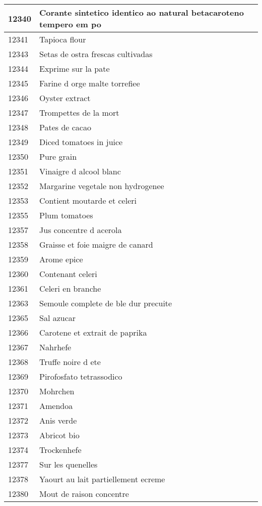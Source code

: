 \begin{longtable}{|l|l|}
12340 & Corante sintetico identico ao natural betacaroteno tempero em po \\ \hline 
12341 & Tapioca flour \\ \hline 
12343 & Setas de ostra frescas cultivadas \\ \hline 
12344 & Exprime sur la pate \\ \hline 
12345 & Farine d orge malte torrefiee \\ \hline 
12346 & Oyster extract \\ \hline 
12347 & Trompettes de la mort \\ \hline 
12348 & Pates de cacao \\ \hline 
12349 & Diced tomatoes in juice \\ \hline 
12350 & Pure grain \\ \hline 
12351 & Vinaigre d alcool blanc \\ \hline 
12352 & Margarine vegetale non hydrogenee \\ \hline 
12353 & Contient moutarde et celeri \\ \hline 
12355 & Plum tomatoes \\ \hline 
12357 & Jus concentre d acerola \\ \hline 
12358 & Graisse et foie maigre de canard \\ \hline 
12359 & Arome epice \\ \hline 
12360 & Contenant celeri \\ \hline 
12361 & Celeri en branche \\ \hline 
12363 & Semoule complete de ble dur precuite \\ \hline 
12365 & Sal azucar \\ \hline 
12366 & Carotene et extrait de paprika \\ \hline 
12367 & Nahrhefe \\ \hline 
12368 & Truffe noire d ete \\ \hline 
12369 & Pirofosfato tetrassodico \\ \hline 
12370 & Mohrchen \\ \hline 
12371 & Amendoa \\ \hline 
12372 & Anis verde \\ \hline 
12373 & Abricot bio \\ \hline 
12374 & Trockenhefe \\ \hline 
12377 & Sur les quenelles \\ \hline 
12378 & Yaourt au lait partiellement ecreme \\ \hline 
12380 & Mout de raison concentre \\ \hline 

\end{longtable}
